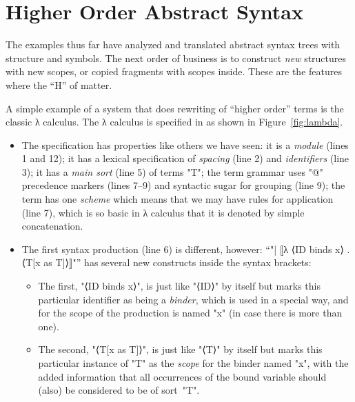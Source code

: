 \documentclass[11pt]{article} %
\begin{document}
\section{Higher Order Abstract Syntax}
\label{sec:hoas}

The examples thus far have analyzed and translated abstract syntax trees with structure and
symbols. The next order of business is to construct \emph{new} structures with new scopes, or copied
fragments with scopes inside. These are the features where the ``H'' of \HAX matter.

\begin{example}
  A simple example of a system that does rewriting of ``higher order'' terms is the classic λ
  calculus. The λ calculus is specified in \HAX as shown in Figure~\ref{fig:lambda}.
  \begin{itemize}

  \item The specification has properties like others we have seen: it is a \emph{module} (lines 1
    and 12); it has a lexical specification of \emph{spacing} (line 2) and \emph{identifiers} (line
    3); it has a \emph{main sort} (line 5) of terms "T"; the term grammar uses "@" precedence
    markers (lines 7--9) and syntactic sugar for grouping (line 9); the term has one \emph{scheme}
    which means that we may have rules for application (line 7), which is so basic in λ calculus
    that it is denoted by simple concatenation.

  \item The first syntax production (line 6) is different, however:
    ``"| ⟦λ ⟨ID binds x⟩ . ⟨T[x as T]⟩⟧"''
    has several new constructs inside the syntax brackets:
    \begin{itemize}

    \item The first, "⟨ID binds x⟩", is just like "⟨ID⟩" by itself but marks this particular
      identifier as being a \emph{binder}, which is used in a special way, and for the scope of the
      production is named "x" (in case there is more than one).

    \item The second, "⟨T[x as T]⟩", is just like "⟨T⟩" by itself but marks this particular instance
      of "T" as the \emph{scope} for the binder named "x", with the added information that all
      occurrences of the bound variable should (also) be considered to be of sort~"T".

    \end{itemize}


\end{itemize}
\end{example}
\end{document}
